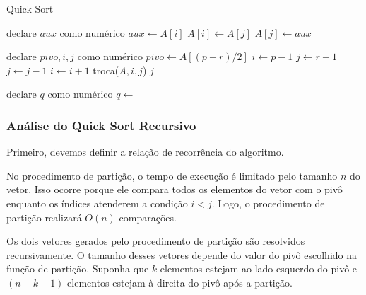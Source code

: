 \begin{algorithm}
    \caption{Quick Sort}
    \label{algo:bubble_sort}
    \begin{algorithmic}[1]
        \Statex
            \State declare $aux$ como numérico
            \State $aux \gets A[i]$
            \State $A[i] \gets A[j]$
            \State $A[j] \gets aux$
        \EndFunction
        \Statex
        
            \State declare $pivo, i, j$ como numérico
            \State $pivo \gets A[(p + r) / 2]$
            \State $i \gets p - 1$
            \State $j \gets r + 1$
                \Repeat
                    \State $j \gets j - 1$
                \Repeat
                    \State $i \gets i + 1$
                    \State troca($A, i, j$)
                \EndIf
            \EndWhile
            \State \Return $j$
        \EndFunction
        \Statex
        
            \State declare $q$ como numérico
                \State $q \gets$ 
                \State {}
                \State {}
            \EndIf
        \EndFunction
            
    \end{algorithmic}
\end{algorithm}

\newpage

\subsubsection{Análise do Quick Sort Recursivo}
Primeiro, devemos definir a relação de recorrência do algoritmo.

No procedimento de partição, o tempo de execução é limitado pelo tamanho \( n \) do vetor. Isso ocorre porque ele compara todos os elementos do vetor com o pivô enquanto os índices atenderem a condição \( i < j \). Logo, o procedimento de partição realizará \( O(n) \) comparações.

Os dois vetores gerados pelo procedimento de partição são resolvidos recursivamente. O tamanho desses vetores depende do valor do pivô escolhido na função de partição. Suponha que \( k \) elementos estejam ao lado esquerdo do pivô e \( (n - k - 1) \) elementos estejam à direita do pivô após a partição.

